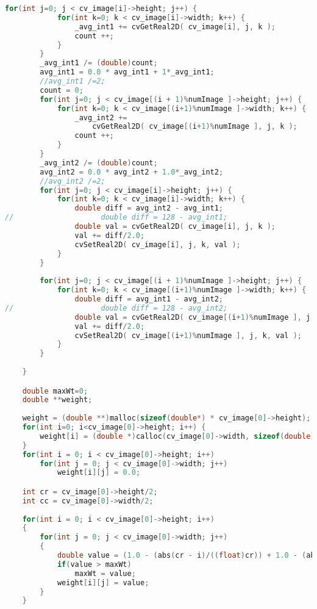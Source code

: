 \documentclass[11pt]{article}
\begin{document}
\begin{lstlisting}[language=C++, caption={ImageBlending}, label=code4]
        for(int j=0; j < cv_image[i]->height; j++) {
            for(int k=0; k < cv_image[i]->width; k++) {
                _avg_int1 += cvGetReal2D( cv_image[i], j, k );
                count ++;
            }
        }
        _avg_int1 /= (double)count;
        avg_int1 = 0.0 * avg_int1 + 1*_avg_int1;
        //avg_int1 /=2;
        count = 0;
        for(int j=0; j < cv_image[(i + 1)%numImage ]->height; j++) {
            for(int k=0; k < cv_image[(i+1)%numImage ]->width; k++) {
                _avg_int2 +=
                    cvGetReal2D( cv_image[(i+1)%numImage ], j, k );
                count ++;
            }
        }
        _avg_int2 /= (double)count;
        avg_int2 = 0.0 * avg_int2 + 1.0*_avg_int2;
        //avg_int2 /=2;
        for(int j=0; j < cv_image[i]->height; j++) {
            for(int k=0; k < cv_image[i]->width; k++) {
                double diff = avg_int2 - avg_int1;
//                    double diff = 128 - avg_int1;
                double val = cvGetReal2D( cv_image[i], j, k );
                val += diff/2.0; 
                cvSetReal2D( cv_image[i], j, k, val );
            }
        }
            
        for(int j=0; j < cv_image[(i + 1)%numImage ]->height; j++) {
            for(int k=0; k < cv_image[(i+1)%numImage ]->width; k++) {
                double diff = avg_int1 - avg_int2;
//                    double diff = 128 - avg_int2;
                double val = cvGetReal2D( cv_image[(i+1)%numImage ], j, k );
                val += diff/2.0; 
                cvSetReal2D( cv_image[(i+1)%numImage ], j, k, val );
            }
        }
            
    }

    double maxWt=0;
    double **weight;
    
    weight = (double **)malloc(sizeof(double*) * cv_image[0]->height);
    for(int i=0; i<cv_image[0]->height; i++) {
        weight[i] = (double *)calloc(cv_image[0]->width, sizeof(double));
    }
    for(int i = 0; i < cv_image[0]->height; i++)
        for(int j = 0; j < cv_image[0]->width; j++)
            weight[i][j] = 0.0;

    int cr = cv_image[0]->height/2;
    int cc = cv_image[0]->width/2;
    
    for(int i = 0; i < cv_image[0]->height; i++)
    {
        for(int j = 0; j < cv_image[0]->width; j++)
        {
            double value = (1.0 - (abs(cr - i)/((float)cr)) + 1.0 - (abs(cc - j)/((float)cc)))/2;
            if(value > maxWt)
                maxWt = value;
            weight[i][j] = value;
        }
    }
                    

\end{lstlisting}
\end{document}
